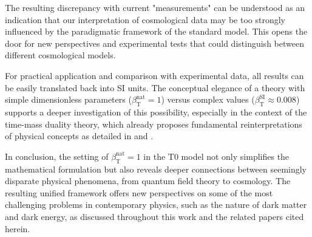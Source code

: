 \documentclass[12pt,a4paper]{article}
\newcommand{\betaT}{\beta_{\text{T}}}
\begin{document}
	The resulting discrepancy with current "measurements" can be understood as an indication that our interpretation of cosmological data may be too strongly influenced by the paradigmatic framework of the standard model. This opens the door for new perspectives and experimental tests that could distinguish between different cosmological models.
	
	For practical application and comparison with experimental data, all results can be easily translated back into SI units. The conceptual elegance of a theory with simple dimensionless parameters (\(\betaT^{\text{nat}} = 1\)) versus complex values (\(\betaT^{\text{SI}} \approx 0.008\)) supports a deeper investigation of this possibility, especially in the context of the time-mass duality theory, which already proposes fundamental reinterpretations of physical concepts as detailed in \cite{pascher_zeit_masse_2025} and \cite{pascher_alphabeta_2025}.
	
	In conclusion, the setting of \(\betaT^{\text{nat}} = 1\) in the T0 model not only simplifies the mathematical formulation but also reveals deeper connections between seemingly disparate physical phenomena, from quantum field theory to cosmology. The resulting unified framework offers new perspectives on some of the most challenging problems in contemporary physics, such as the nature of dark matter and dark energy, as discussed throughout this work and the related papers cited herein.
	
\end{document}

